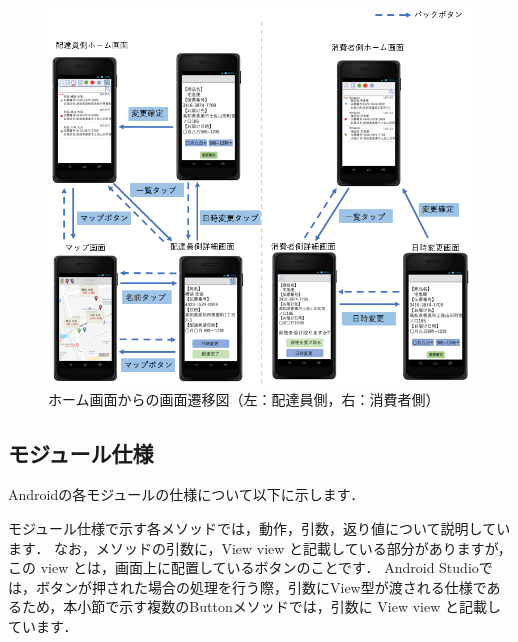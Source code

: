 \documentclass[a4j,titlepage]{jarticle}
\begin{document}
\begin{figure}[H]
 \begin{center}
  \includegraphics[width=150mm]{screen_transition_home.png}
  \caption{ホーム画面からの画面遷移図（左：配達員側，右：消費者側）}
  \label{fig:home}
 \end{center}
\end{figure}

\subsection{モジュール仕様}
Androidの各モジュールの仕様について以下に示します．

モジュール仕様で示す各メソッドでは，動作，引数，返り値について説明しています．
なお，メソッドの引数に，View view と記載している部分がありますが，この view とは，画面上に配置しているボタンのことです．
Android Studioでは，ボタンが押された場合の処理を行う際，引数にView型が渡される仕様であるため，本小節で示す複数のButtonメソッドでは，引数に View view と記載しています．
\end{document}
